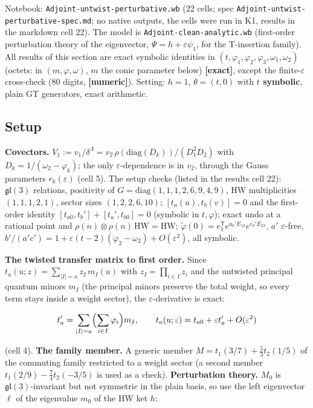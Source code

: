\documentclass[10pt]{article}
\newcommand{\nb}[1]{\texttt{#1}}
\begin{document}
Notebook: \nb{Adjoint-\allowbreak{}untwist-\allowbreak{}perturbative.\allowbreak{}wb} (22 cells; spec \nb{Adjoint-\allowbreak{}untwist-\allowbreak{}perturbative-\allowbreak{}spec.\allowbreak{}md}; no native outputs, the cells were run in K1, results in the markdown cell 22). The model is \nb{Adjoint-\allowbreak{}clean-\allowbreak{}analytic.\allowbreak{}wb} (first-order perturbation theory of the eigenvector, $\Psi=h+\varepsilon\psi_1$, for the T-insertion family). All results of this section are exact symbolic identities in $(t,\varphi_1,\varphi_2,\varphi_3,\omega_1,\omega_2)$ (octets: in $(m,\varphi,\omega)$, $m$ the conic parameter below) \textbf{[exact]}, except the finite-$\varepsilon$ cross-check (80 digits, \textbf{[numeric]}). Setting: $h=1$, $\theta=(t,0)$ with \textbf{$t$ symbolic}, plain GT generators, exact arithmetic.

\subsection{Setup}\label{sec:pertsetup}

\textbf{Covectors.} $V_1:=v_1/\delta^\Lambda=v_2\,\rho(\mathrm{diag}(D_k))/(D_1^2D_2)$ with $D_k=1/(\omega_2-\varphi_k)$; the only $\varepsilon$-dependence is in $v_2$, through the Gauss parameters $r_k(\varepsilon)$ (cell 5). The setup checks (listed in the results cell 22): $\mathfrak{gl}(3)$ relations, positivity of $G=\mathrm{diag}(1,1,1,2,6,9,4,9)$, HW multiplicities $(1,1,1,2,1)$, sector sizes $(1,2,2,6,10)$; $[t_a(u),t_b(v)]=0$ and the first-order identity $[t_{a0},t_b']+[t_a',t_{b0}]=0$ (symbolic in $t,\varphi$); exact undo at a rational point and $\rho(n)\otimes\rho(n)\,\mathrm{HW}=\mathrm{HW}$; $\tilde\varphi(0)=e_1^{\mathsf T}e^{a_0'E_{12}}e^{c_0'E_{23}}$, $a'$ $\varepsilon$-free, $b'/(a'c')=1+\varepsilon(t-2)(\varphi_2-\omega_2)+O(\varepsilon^2)$, all symbolic.

\textbf{The twisted transfer matrix to first order.} Since $t_a(u;z)=\sum_{|I|=a}z_I\,m_I(u)$ with $z_I=\prod_{i\in I}z_i$ and the untwisted principal quantum minors $m_I$ (the principal minors preserve the total weight, so every term stays inside a weight sector), the $\varepsilon$-derivative is exact:

\[
t_a'=\sum_{|I|=a}\Bigl(\sum_{i\in I}\varphi_i\Bigr)m_I,\qquad t_a(u;\varepsilon)=t_{a0}+\varepsilon t_a'+O(\varepsilon^2)
\]

(cell 4). \textbf{The family member.} A generic member $M=t_1(3/7)+\tfrac53t_2(1/5)$ of the commuting family restricted to a weight sector (a second member $t_1(2/9)-\tfrac74t_2(-3/5)$ is used as a check). \textbf{Perturbation theory.} $M_0$ is $\mathfrak{gl}(3)$-invariant but not symmetric in the plain basis, so use the left eigenvector $\ell$ of the eigenvalue $m_0$ of the HW ket $h$:
\end{document}
